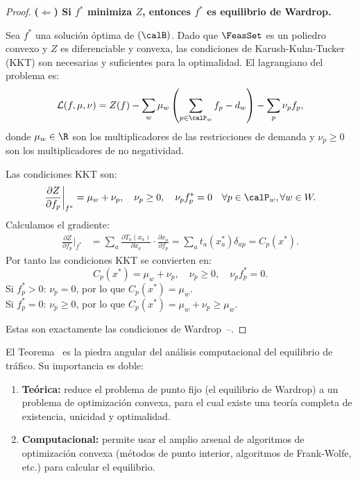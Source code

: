 \begin{proof}
\medskip
\noindent\textbf{($\Leftarrow$) Si $f^*$ minimiza $Z$, entonces $f^*$ es equilibrio de Wardrop.}

Sea $f^*$ una solución óptima de $(\calB)$. Dado que $\FeasSet$ es un poliedro convexo y $Z$ es diferenciable y convexa, las condiciones de Karush-Kuhn-Tucker (KKT) son necesarias y suficientes para la optimalidad. El lagrangiano del problema es:
\[
\mathcal{L}(f, \mu, \nu) = Z(f) - \sum_{w} \mu_w \left(\sum_{p \in \calP_w} f_p - d_w\right) - \sum_p \nu_p f_p,
\]
donde $\mu_w \in \R$ son los multiplicadores de las restricciones de demanda y $\nu_p \geq 0$ son los multiplicadores de no negatividad.

Las condiciones KKT son:
\[
\frac{\partial Z}{\partial f_p}\bigg|_{f^*} = \mu_w + \nu_p, \quad \nu_p \geq 0, \quad \nu_p f_p^* = 0 \quad \forall p \in \calP_w, \forall w \in W.
\]
Calculamos el gradiente:
\begin{align}
\frac{\partial Z}{\partial f_p}\bigg|_{f^*} &= \sum_{a} \frac{\partial T_a(x_a)}{\partial x_a} \cdot \frac{\partial x_a}{\partial f_p} = \sum_a t_a(x_a^*) \delta_{ap} = C_p(x^*). \label{eq:gradient}
\end{align}
Por tanto las condiciones KKT se convierten en:
\[
C_p(x^*) = \mu_w + \nu_p, \quad \nu_p \geq 0, \quad \nu_p f_p^* = 0.
\]
Si $f_p^* > 0$: $\nu_p = 0$, por lo que $C_p(x^*) = \mu_w$.\\
Si $f_p^* = 0$: $\nu_p \geq 0$, por lo que $C_p(x^*) = \mu_w + \nu_p \geq \mu_w$.

Estas son exactamente las condiciones de Wardrop~--.
\end{proof}

\begin{remark}
El Teorema~ es la piedra angular del análisis computacional del equilibrio de tráfico. Su importancia es doble:
\begin{enumerate}
    \item \textbf{Teórica:} reduce el problema de punto fijo (el equilibrio de Wardrop) a un problema de optimización convexa, para el cual existe una teoría completa de existencia, unicidad y optimalidad.
    \item \textbf{Computacional:} permite usar el amplio arsenal de algoritmos de optimización convexa (métodos de punto interior, algoritmos de Frank-Wolfe, etc.) para calcular el equilibrio.
\end{enumerate}
\end{remark}
